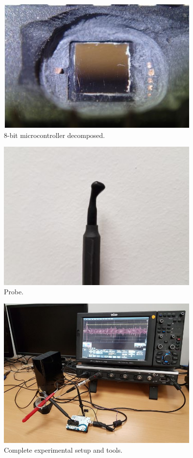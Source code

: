\begin{figure}
    \centering
    \includegraphics[width=0.9\textwidth]{images/chapter8/exp_a.JPG}
    \caption{8-bit microcontroller decomposed.}
    \label{fig:chapter8_mc}
\end{figure}

\begin{figure}
    \centering
    \includegraphics[width=0.9\textwidth]{images/chapter8/exp-b.JPG}
    \caption{Probe.}
    \label{fig:chapter8_probe}
\end{figure}

\begin{figure}
    \centering
    \includegraphics[width=0.9\textwidth]{images/chapter8/exp-c.JPG}
    \caption{Complete experimental setup and tools.}
    \label{fig:chapter8_complete}
\end{figure}

